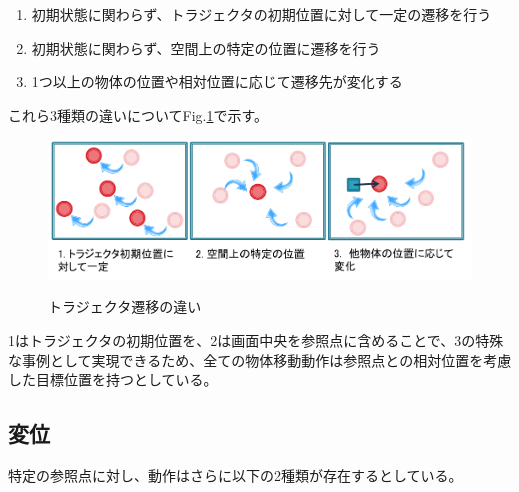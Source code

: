 	\begin{enumerate}
		\item 初期状態に関わらず、トラジェクタの初期位置に対して一定の遷移を行う
		\item 初期状態に関わらず、空間上の特定の位置に遷移を行う
		\item 1つ以上の物体の位置や相対位置に応じて遷移先が変化する
	\end{enumerate}
これら3種類の違いについてFig.\ref{figure:2_moving_trajector}で示す。
	\begin{figure}[h]
		\begin{center}
			\includegraphics[width=14cm]{figure1.png} \\ %
			\caption{トラジェクタ遷移の違い}
			\label{figure:2_moving_trajector}
		\end{center}
	\end{figure}
1はトラジェクタの初期位置を、2は画面中央を参照点に含めることで、3の特殊な事例として実現できるため、全ての物体移動動作は参照点との相対位置を考慮した目標位置を持つとしている。

\subsection{変位}

特定の参照点に対し、動作はさらに以下の2種類が存在するとしている。

